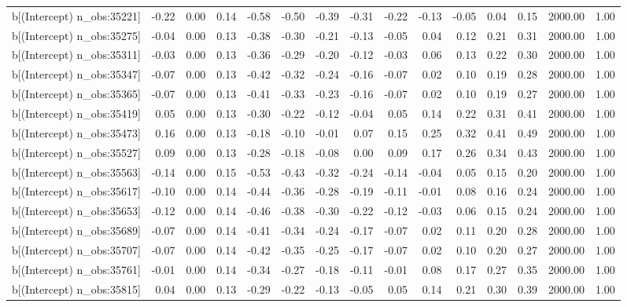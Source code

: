 \begin{table}[ht]
\begin{tabular}{rrrrrrrrrrrrrrr}
  b[(Intercept) n\_obs:35221] & -0.22 & 0.00 & 0.14 & -0.58 & -0.50 & -0.39 & -0.31 & -0.22 & -0.13 & -0.05 & 0.04 & 0.15 & 2000.00 & 1.00 \\ 
  b[(Intercept) n\_obs:35275] & -0.04 & 0.00 & 0.13 & -0.38 & -0.30 & -0.21 & -0.13 & -0.05 & 0.04 & 0.12 & 0.21 & 0.31 & 2000.00 & 1.00 \\ 
  b[(Intercept) n\_obs:35311] & -0.03 & 0.00 & 0.13 & -0.36 & -0.29 & -0.20 & -0.12 & -0.03 & 0.06 & 0.13 & 0.22 & 0.30 & 2000.00 & 1.00 \\ 
  b[(Intercept) n\_obs:35347] & -0.07 & 0.00 & 0.13 & -0.42 & -0.32 & -0.24 & -0.16 & -0.07 & 0.02 & 0.10 & 0.19 & 0.28 & 2000.00 & 1.00 \\ 
  b[(Intercept) n\_obs:35365] & -0.07 & 0.00 & 0.13 & -0.41 & -0.33 & -0.23 & -0.16 & -0.07 & 0.02 & 0.10 & 0.19 & 0.27 & 2000.00 & 1.00 \\ 
  b[(Intercept) n\_obs:35419] & 0.05 & 0.00 & 0.13 & -0.30 & -0.22 & -0.12 & -0.04 & 0.05 & 0.14 & 0.22 & 0.31 & 0.41 & 2000.00 & 1.00 \\ 
  b[(Intercept) n\_obs:35473] & 0.16 & 0.00 & 0.13 & -0.18 & -0.10 & -0.01 & 0.07 & 0.15 & 0.25 & 0.32 & 0.41 & 0.49 & 2000.00 & 1.00 \\ 
  b[(Intercept) n\_obs:35527] & 0.09 & 0.00 & 0.13 & -0.28 & -0.18 & -0.08 & 0.00 & 0.09 & 0.17 & 0.26 & 0.34 & 0.43 & 2000.00 & 1.00 \\ 
  b[(Intercept) n\_obs:35563] & -0.14 & 0.00 & 0.15 & -0.53 & -0.43 & -0.32 & -0.24 & -0.14 & -0.04 & 0.05 & 0.15 & 0.20 & 2000.00 & 1.00 \\ 
  b[(Intercept) n\_obs:35617] & -0.10 & 0.00 & 0.14 & -0.44 & -0.36 & -0.28 & -0.19 & -0.11 & -0.01 & 0.08 & 0.16 & 0.24 & 2000.00 & 1.00 \\ 
  b[(Intercept) n\_obs:35653] & -0.12 & 0.00 & 0.14 & -0.46 & -0.38 & -0.30 & -0.22 & -0.12 & -0.03 & 0.06 & 0.15 & 0.24 & 2000.00 & 1.00 \\ 
  b[(Intercept) n\_obs:35689] & -0.07 & 0.00 & 0.14 & -0.41 & -0.34 & -0.24 & -0.17 & -0.07 & 0.02 & 0.11 & 0.20 & 0.28 & 2000.00 & 1.00 \\ 
  b[(Intercept) n\_obs:35707] & -0.07 & 0.00 & 0.14 & -0.42 & -0.35 & -0.25 & -0.17 & -0.07 & 0.02 & 0.10 & 0.20 & 0.27 & 2000.00 & 1.00 \\ 
  b[(Intercept) n\_obs:35761] & -0.01 & 0.00 & 0.14 & -0.34 & -0.27 & -0.18 & -0.11 & -0.01 & 0.08 & 0.17 & 0.27 & 0.35 & 2000.00 & 1.00 \\ 
  b[(Intercept) n\_obs:35815] & 0.04 & 0.00 & 0.13 & -0.29 & -0.22 & -0.13 & -0.05 & 0.05 & 0.14 & 0.21 & 0.30 & 0.39 & 2000.00 & 1.00 \\ 

\end{tabular}
\end{table}
